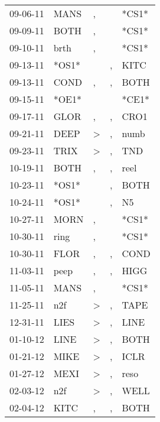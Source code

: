 \begin{supertabular}{lllll}
 09-06-11 &   MANS &                , &                  &  *CS1* \\
 09-09-11 &   BOTH &                , &                  &  *CS1* \\
 09-10-11 &   brth &                , &                  &  *CS1* \\
 09-13-11 &  *OS1* &                  &                , &   KITC \\
 09-13-11 &   COND &                , &                , &   BOTH \\
 09-15-11 &  *OE1* &                  &                  &  *CE1* \\
 09-17-11 &   GLOR &                , &                , &   CRO1 \\
 09-21-11 &   DEEP &     \textgreater &                , &   numb \\
 09-23-11 &   TRIX &     \textgreater &                , &    TND \\
 10-19-11 &   BOTH &                , &                , &   reel \\
 10-23-11 &  *OS1* &                  &                , &   BOTH \\
 10-24-11 &  *OS1* &                  &                , &     N5 \\
 10-27-11 &   MORN &                , &                  &  *CS1* \\
 10-30-11 &   ring &                , &                  &  *CS1* \\
 10-30-11 &   FLOR &                , &                , &   COND \\
 11-03-11 &   peep &                , &                , &   HIGG \\
 11-05-11 &   MANS &                , &                  &  *CS1* \\
 11-25-11 &    n2f &     \textgreater &                , &   TAPE \\
 12-31-11 &   LIES &     \textgreater &                , &   LINE \\
 01-10-12 &   LINE &     \textgreater &                , &   BOTH \\
 01-21-12 &   MIKE &     \textgreater &                , &   ICLR \\
 01-27-12 &   MEXI &     \textgreater &                , &   reso \\
 02-03-12 &    n2f &     \textgreater &                , &   WELL \\
 02-04-12 &   KITC &                , &                , &   BOTH \\

\end{supertabular}
